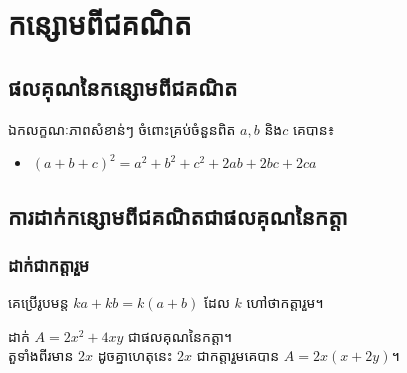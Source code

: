 \chapter{កន្សោមពីជគណិត}
\section{ផលគុណនៃកន្សោមពីជគណិត}
\begin{propertyT}{ឯកលក្ខណៈភាពសំខាន់ៗ}
ចំពោះគ្រប់ចំនួនពិត $a,b$ និង$c$ គេបាន៖
\begin{itemize}
\item $(a+b+c)^2=a^2+b^2+c^2+2ab+2bc+2ca$
\end{itemize}
\end{propertyT}
\section{ការដាក់កន្សោមពីជគណិតជាផលគុណនៃកត្តា}
\subsection{ដាក់ជាកត្តារួម}
\begin{generalT}
គេប្រើរូបមន្ត $ka+kb=k(a+b)$ ដែល $k$ ហៅថាកត្តារួម។
\end{generalT}
\begin{exampleT}
ដាក់ $A=2x^2+4xy$ ជាផលគុណនៃកត្តា។ \\តួទាំងពីរមាន $2x$ ដូចគ្នាហេតុនេះ $2x$ ជាកត្តារួមគេបាន $A=2x(x+2y)$។
\end{exampleT}
